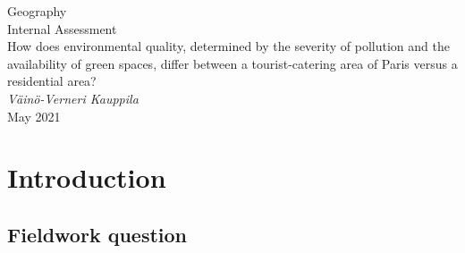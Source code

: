 \documentclass[11pt,letterpaper]{article}
\begin{document}



\begin{titlepage}
    \begin{center}
        \vspace*{4cm}
        Geography\\
        Internal Assessment \\
        \vspace{1cm}
        How does environmental quality, determined by the severity of pollution and the availability of green spaces, differ between a tourist-catering area of Paris versus a residential area? \\
        \vspace{1cm}
        \textit{Väinö-Verneri Kauppila} \\
        May 2021 \\
        \vspace{4cm}
        
        \vfill
        \vspace{0.1cm}
    \end{center}
\end{titlepage}



\begin{center}
    \tableofcontents
    \vspace{1in}

\end{center}



\newpage


\section{Introduction}
\label{sec:intro}

\subsection{Fieldwork question}
\end{document}
